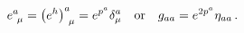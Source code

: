 \begin{equation}
\label{metriccoord} e^a_{~\mu}=\left(
e^h\right)^a_{~\mu}=e^{p^a}\delta_\mu^a~~~ {\rm or}~~~  g_{aa}=
e^{2p^a}\eta_{aa}\, .
\end{equation} 
